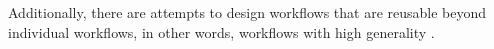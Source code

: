 Additionally, there are attempts to design workflows that are reusable beyond individual workflows, in other words, workflows with high generality \cite{hardisty2020canonical}.








